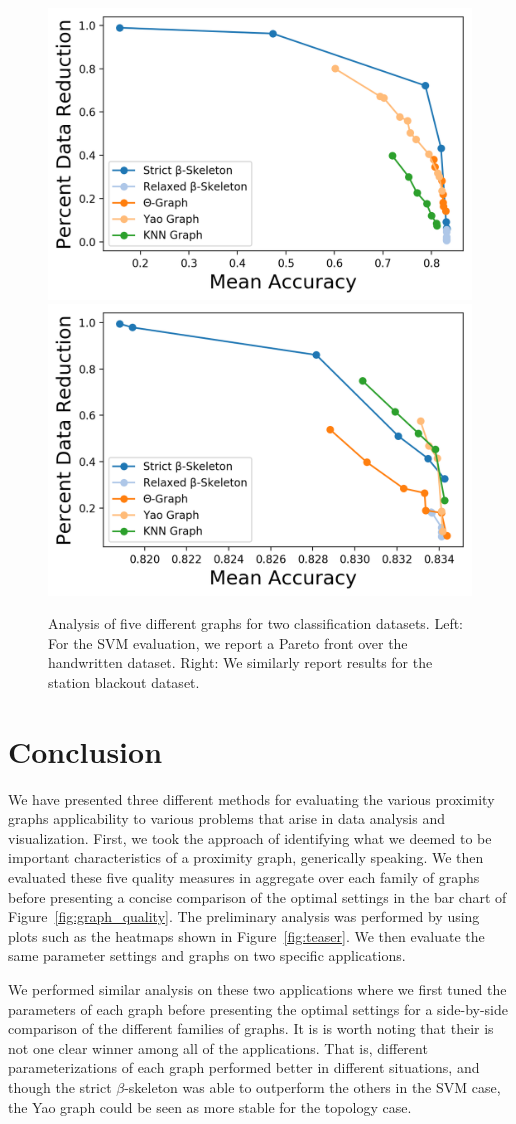 \begin{figure}[htbp]
    \centering
    \includegraphics[width=0.48\linewidth]{figs/chap7/pareto_letters.png}
    \includegraphics[width=0.48\linewidth]{figs/chap7/pareto_sbo.png}
    \caption{Analysis of five different graphs for two classification datasets.
    Left: For the SVM evaluation, we report a Pareto front over the handwritten dataset.
    Right: We similarly report results for the station blackout dataset.}
    \label{fig:graph_svm}
\end{figure}

\section{Conclusion}
We have presented three different methods for evaluating the various proximity graphs applicability to various problems that arise in data analysis and visualization.
%
First, we took the approach of identifying what we deemed to be important characteristics of a proximity graph, generically speaking.
%
We then evaluated these five quality measures in aggregate over each family of graphs before presenting a concise comparison of the optimal settings in the bar chart of Figure~\ref{fig:graph_quality}.
%
The preliminary analysis was performed by using plots such as the heatmaps shown in Figure~\ref{fig:teaser}.
%
We then evaluate the same parameter settings and graphs on two specific applications.

We performed similar analysis on these two applications where we first tuned the parameters of each graph before presenting the optimal settings for a side-by-side comparison of the different families of graphs.
%
It is is worth noting that their is not one clear winner among all of the applications.
%
That is, different parameterizations of each graph performed better in different situations, and though the strict $\beta$-skeleton was able to outperform the others in the SVM case, the Yao graph could be seen as more stable for the topology case.

